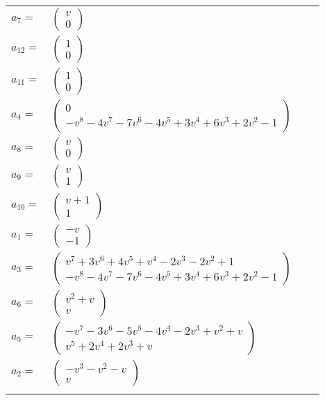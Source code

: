 \documentclass[1p]{elsarticle_modified}
\theoremstyle{definition}
\begin{document}
\begin{tabular}{m{7pt} m{180pt} m{7pt} m{180pt} }
\flushright $a_{7}=$&$\begin{pmatrix}v\\0\end{pmatrix}$ \\
\flushright $a_{12}=$&$\begin{pmatrix}1\\0\end{pmatrix}$ \\
\flushright $a_{11}=$&$\begin{pmatrix}1\\0\end{pmatrix}$ \\
\flushright $a_{4}=$&$\begin{pmatrix}0\\- v^8-4 v^7-7 v^6-4 v^5+3 v^4+6 v^3+2 v^2-1\end{pmatrix}$ \\
\flushright $a_{8}=$&$\begin{pmatrix}v\\0\end{pmatrix}$ \\
\flushright $a_{9}=$&$\begin{pmatrix}v\\1\end{pmatrix}$ \\
\flushright $a_{10}=$&$\begin{pmatrix}v+1\\1\end{pmatrix}$ \\
\flushright $a_{1}=$&$\begin{pmatrix}- v\\-1\end{pmatrix}$ \\
\flushright $a_{3}=$&$\begin{pmatrix}v^7+3 v^6+4 v^5+v^4-2 v^3-2 v^2+1\\- v^8-4 v^7-7 v^6-4 v^5+3 v^4+6 v^3+2 v^2-1\end{pmatrix}$ \\
\flushright $a_{6}=$&$\begin{pmatrix}v^2+v\\v\end{pmatrix}$ \\
\flushright $a_{5}=$&$\begin{pmatrix}- v^7-3 v^6-5 v^5-4 v^4-2 v^3+v^2+v\\v^5+2 v^4+2 v^3+v\end{pmatrix}$ \\
\flushright $a_{2}=$&$\begin{pmatrix}- v^3- v^2- v\\v\end{pmatrix}$\\&\end{tabular}
\end{document}
